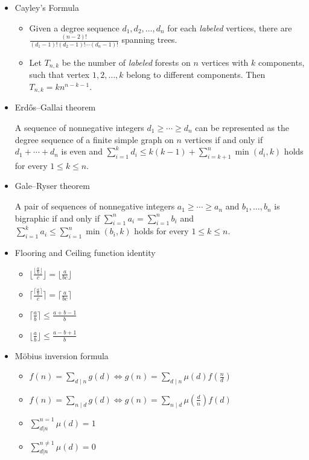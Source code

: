 \begin{itemize}
\item Cayley's Formula

\begin{itemize}
    \itemsep-0.5em
  \item Given a degree sequence $d_1, d_2, \ldots, d_n$ for each \textit{labeled} vertices, there are $\frac{(n - 2)!}{(d_1 - 1)!(d_2 - 1)!\cdots(d_n - 1)!}$ spanning trees.
  \item Let $T_{n, k}$ be the number of \textit{labeled} forests on $n$ vertices with $k$ components, such that vertex $1, 2, \ldots, k$ belong to different components. Then $T_{n, k} = kn^{n - k - 1}$.
\end{itemize}

\item Erdős–Gallai theorem 

A sequence of nonnegative integers $d_1\ge\cdots\ge d_n$ can be represented as the degree sequence of a finite simple graph on $n$ vertices if and only if $d_1+\cdots+d_n$ is even and $\displaystyle\sum_{i=1}^kd_i\le k(k-1)+\displaystyle\sum_{i=k+1}^n\min(d_i,k)$ holds for every $1\le k\le n$.

\item Gale–Ryser theorem

A pair of sequences of nonnegative integers $a_1\ge\cdots\ge a_n$ and $b_1,\ldots,b_n$ is bigraphic if and only if $\displaystyle\sum_{i=1}^n a_i=\displaystyle\sum_{i=1}^n b_i$ and $\displaystyle\sum_{i=1}^k a_i\le \displaystyle\sum_{i=1}^n\min(b_i,k)$ holds for every $1\le k\le n$.

\item Flooring and Ceiling function identity

\begin{itemize} 
    \itemsep-0.1em
  \item $\lfloor \frac{\lfloor \frac{a}{b} \rfloor}{c} \rfloor = \lfloor \frac{a}{bc} \rfloor$
  \item $\lceil \frac{\lceil \frac{a}{b} \rceil}{c} \rceil = \lceil \frac{a}{bc} \rceil$
  \item $\lceil \frac{a}{b} \rceil \leq \frac{a+b-1}{b}$
  \item $\lfloor \frac{a}{b} \rfloor \leq \frac{a-b+1}{b}$ 
\end{itemize}

\item Möbius inversion formula

\begin{itemize}
    \itemsep-0.5em
  \item $f(n)=\sum_{d\mid n}g(d)\Leftrightarrow g(n)=\sum_{d\mid n}\mu(d)f(\frac{n}{d})$
  \item $f(n)=\sum_{n\mid d}g(d)\Leftrightarrow g(n)=\sum_{n\mid d}\mu(\frac{d}{n})f(d)$
  \item $\sum_{d \vert n}^{n=1} \mu (d)	= 1$
  \item $\sum_{d \vert n}^{n \neq 1} \mu (d)	= 0$
\end{itemize}


\end{itemize}
